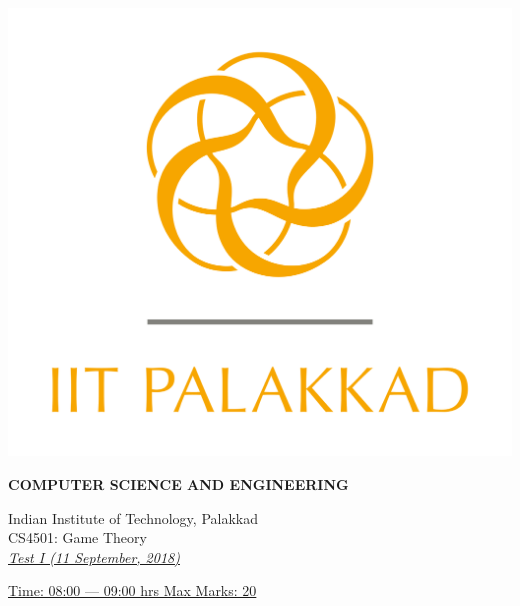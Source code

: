 \documentclass[11pt,paper=a4,answers]{exam}
\begin{document}
	
	
	\noindent
	\begin{minipage}[l]{.14\textwidth}%
		\noindent
		\includegraphics[scale=0.3]{logo}
	\end{minipage}
	\hfill
	\begin{minipage}[r]{.65\textwidth}%
		\begin{center}
			{\large \bfseries COMPUTER SCIENCE AND ENGINEERING \par
				\large Indian Institute of Technology, Palakkad \\[2pt]
				CS4501: Game Theory\\
				\normalsize\emph{\underline{Test I (11 September, 2018)}}
			}
		\end{center}
	\end{minipage}
	\hfill
	\begin{minipage}[r]{.14\textwidth}%
		\noindent
		\begin{flushright}
			{\footnotesize }	
		\end{flushright}
	\end{minipage}
	\par
	\noindent
	\uline{ Time: 08:00 --- 09:00 hrs \hfill  Max Marks: 20 }
	
\end{document}
